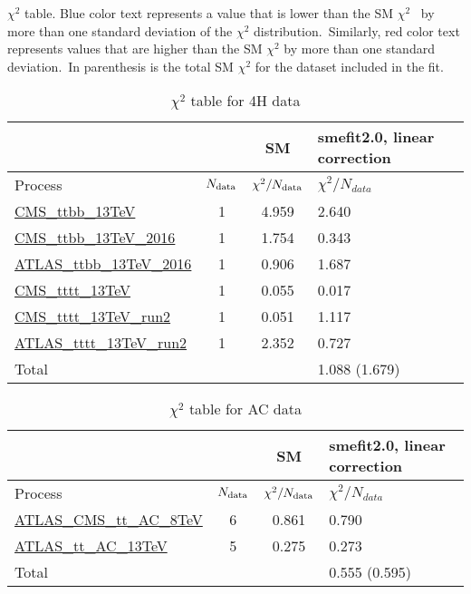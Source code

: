 \documentclass{article}
\begin{document}
$\chi^2$ table. Blue color text represents a value that is lower than the SM $\chi^2$ \
            by more than one standard deviation of the $\chi^2$ distribution.\
            Similarly, red color text represents values that are higher than the SM $\chi^2$ by more than one standard deviation.\
            In parenthesis is the total SM $\chi^2$ for the dataset included in the fit.
\begin{table}[H]
\centering
\begin{tabular}{|l|c|c|C{3cm}|}
\hline
  & SM& smefit2.0, linear correction\\ \hline
Process & $N_{\rm data}$ & $\chi^ 2/N_{\rm data}$& $\chi^ 2/N_{data}$\\ \hline
\href{https://arxiv.org/abs/1705.10141}{CMS_ttbb_13TeV} & 1 & 4.959 & {\color{black} 2.640} \\ \hline
\href{https://arxiv.org/abs/1909.05306}{CMS_ttbb_13TeV_2016} & 1 & 1.754 & {\color{black} 0.343} \\ \hline
\href{https://arxiv.org/abs/1811.12113}{ATLAS_ttbb_13TeV_2016} & 1 & 0.906 & {\color{black} 1.687} \\ \hline
\href{https://arxiv.org/abs/1710.10614}{CMS_tttt_13TeV} & 1 & 0.055 & {\color{black} 0.017} \\ \hline
\href{https://arxiv.org/abs/1908.06463}{CMS_tttt_13TeV_run2} & 1 & 0.051 & {\color{black} 1.117} \\ \hline
\href{https://arxiv.org/abs/2007.14858}{ATLAS_tttt_13TeV_run2} & 1 & 2.352 & {\color{blue} 0.727} \\ \hline
\hline Total & &  & 1.088 (1.679) \\ \hline
\end{tabular}
\caption{$\chi^2$ table for 4H data}
\end{table}
\begin{table}[H]
\centering
\begin{tabular}{|l|c|c|C{3cm}|}
\hline
  & SM& smefit2.0, linear correction\\ \hline
Process & $N_{\rm data}$ & $\chi^ 2/N_{\rm data}$& $\chi^ 2/N_{data}$\\ \hline
\href{https://arxiv.org/abs/1709.05327}{ATLAS_CMS_tt_AC_8TeV} & 6 & 0.861 & {\color{black} 0.790} \\ \hline
\href{https://cds.cern.ch/record/2682109}{ATLAS_tt_AC_13TeV} & 5 & 0.275 & {\color{black} 0.273} \\ \hline
\hline Total & &  & 0.555 (0.595) \\ \hline
\end{tabular}
\caption{$\chi^2$ table for AC data}
\end{table}
\end{document}
